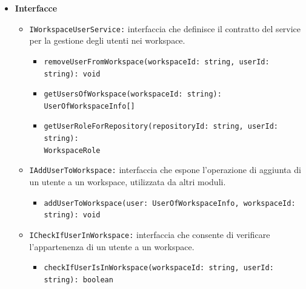 \documentclass[a4paper, 11pt]{article}
\newcounter{subsubsubsection}[subsubsection]
\newcounter{subsubsubsubsection}[subsubsubsection]
\begin{document}
\begin{itemize}

    \item \textbf{Interfacce}
    \begin{itemize}
    
        \item \texttt{IWorkspaceUserService:} interfaccia che definisce il contratto del service per la gestione degli utenti nei workspace.
        \begin{itemize}
            \item \texttt{removeUserFromWorkspace(workspaceId: string, userId: string): void} 
            \item \texttt{getUsersOfWorkspace(workspaceId: string): UserOfWorkspaceInfo[]} 
            \item \texttt{getUserRoleForRepository(repositoryId: string, userId: string):\\ WorkspaceRole} 
        \end{itemize}        
        \item \texttt{IAddUserToWorkspace:} interfaccia che espone l'operazione di aggiunta di un utente a un workspace, utilizzata da altri moduli.
        \begin{itemize}
            \item \texttt{addUserToWorkspace(user: UserOfWorkspaceInfo, workspaceId: string): void} 
        \end{itemize}
        
        \item \texttt{ICheckIfUserInWorkspace:} interfaccia che consente di verificare l'appartenenza di un utente a un workspace.
        \begin{itemize}
            \item \texttt{checkIfUserIsInWorkspace(workspaceId: string, userId: string): boolean} 
        \end{itemize}
        

\end{itemize}
\end{itemize}
\end{document}
